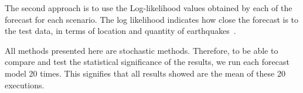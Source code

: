 The second approach is to use the Log-likelihood values obtained by
each of the forecast for each scenario. The log likelihood indicates
how close the forecast is to the test data, in terms of location and
quantity of earthquakes~\cite{ecta14}.

All methods presented here are stochastic methods. Therefore,
to be able to compare and test the statistical significance of the
results, we run each forecast model 20 times. This signifies that all
results showed are the mean of these 20 executions.

%





